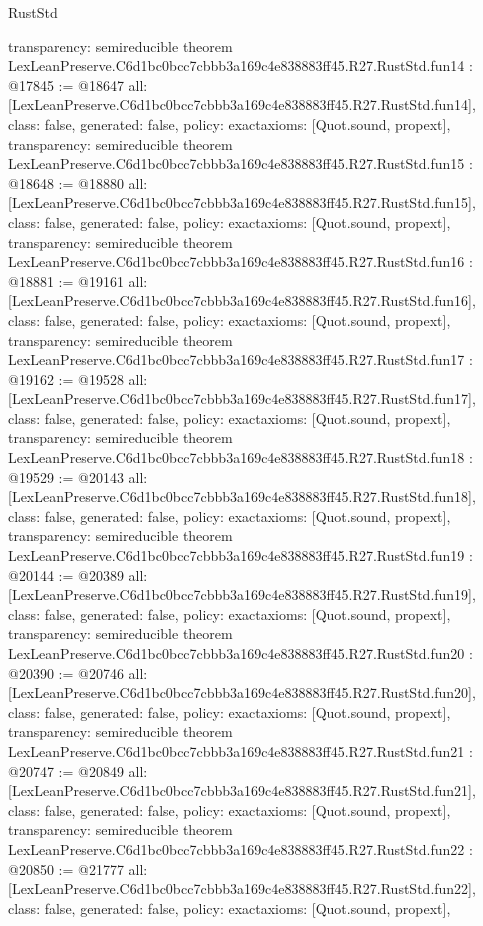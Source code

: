 \begin{lexlean}{RustStd}
\begin{coremodule}
{  transparency: semireducible
}
theorem LexLeanPreserve.C6d1bc0bcc7cbbb3a169c4e838883ff45.R27.RustStd.fun14 : @17845 := @18647 {
  all: [LexLeanPreserve.C6d1bc0bcc7cbbb3a169c4e838883ff45.R27.RustStd.fun14],
  class: false,
  generated: false,
  policy: exact{axioms: [Quot.sound, propext]},
  transparency: semireducible
}
theorem LexLeanPreserve.C6d1bc0bcc7cbbb3a169c4e838883ff45.R27.RustStd.fun15 : @18648 := @18880 {
  all: [LexLeanPreserve.C6d1bc0bcc7cbbb3a169c4e838883ff45.R27.RustStd.fun15],
  class: false,
  generated: false,
  policy: exact{axioms: [Quot.sound, propext]},
  transparency: semireducible
}
theorem LexLeanPreserve.C6d1bc0bcc7cbbb3a169c4e838883ff45.R27.RustStd.fun16 : @18881 := @19161 {
  all: [LexLeanPreserve.C6d1bc0bcc7cbbb3a169c4e838883ff45.R27.RustStd.fun16],
  class: false,
  generated: false,
  policy: exact{axioms: [Quot.sound, propext]},
  transparency: semireducible
}
theorem LexLeanPreserve.C6d1bc0bcc7cbbb3a169c4e838883ff45.R27.RustStd.fun17 : @19162 := @19528 {
  all: [LexLeanPreserve.C6d1bc0bcc7cbbb3a169c4e838883ff45.R27.RustStd.fun17],
  class: false,
  generated: false,
  policy: exact{axioms: [Quot.sound, propext]},
  transparency: semireducible
}
theorem LexLeanPreserve.C6d1bc0bcc7cbbb3a169c4e838883ff45.R27.RustStd.fun18 : @19529 := @20143 {
  all: [LexLeanPreserve.C6d1bc0bcc7cbbb3a169c4e838883ff45.R27.RustStd.fun18],
  class: false,
  generated: false,
  policy: exact{axioms: [Quot.sound, propext]},
  transparency: semireducible
}
theorem LexLeanPreserve.C6d1bc0bcc7cbbb3a169c4e838883ff45.R27.RustStd.fun19 : @20144 := @20389 {
  all: [LexLeanPreserve.C6d1bc0bcc7cbbb3a169c4e838883ff45.R27.RustStd.fun19],
  class: false,
  generated: false,
  policy: exact{axioms: [Quot.sound, propext]},
  transparency: semireducible
}
theorem LexLeanPreserve.C6d1bc0bcc7cbbb3a169c4e838883ff45.R27.RustStd.fun20 : @20390 := @20746 {
  all: [LexLeanPreserve.C6d1bc0bcc7cbbb3a169c4e838883ff45.R27.RustStd.fun20],
  class: false,
  generated: false,
  policy: exact{axioms: [Quot.sound, propext]},
  transparency: semireducible
}
theorem LexLeanPreserve.C6d1bc0bcc7cbbb3a169c4e838883ff45.R27.RustStd.fun21 : @20747 := @20849 {
  all: [LexLeanPreserve.C6d1bc0bcc7cbbb3a169c4e838883ff45.R27.RustStd.fun21],
  class: false,
  generated: false,
  policy: exact{axioms: [Quot.sound, propext]},
  transparency: semireducible
}
theorem LexLeanPreserve.C6d1bc0bcc7cbbb3a169c4e838883ff45.R27.RustStd.fun22 : @20850 := @21777 {
  all: [LexLeanPreserve.C6d1bc0bcc7cbbb3a169c4e838883ff45.R27.RustStd.fun22],
  class: false,
  generated: false,
  policy: exact{axioms: [Quot.sound, propext]},
}
\end{coremodule}
\end{lexlean}
